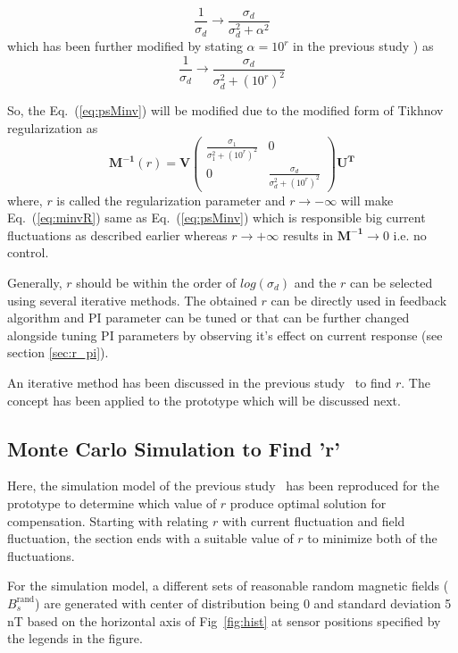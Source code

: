 \begin{equation}
    \frac{1}{\sigma_d} \rightarrow \frac{\sigma_d}{\sigma_d^2+\alpha^2} 
\end{equation}
which has been further modified by stating $\alpha=10^r$ in the previous study \cite{bea}) as
\begin{equation}\label{eq:sigma}
    \frac{1}{\sigma_d} \rightarrow \frac{\sigma_d}{\sigma_d^2+(10^r)^2}
\end{equation}

So, the Eq.~(\ref{eq:psMinv}) will be modified due to the modified form of Tikhnov regularization as
\begin{equation}\label{eq:minvR}
    \bm{M^{-1}}(r) = \bm{V}\begin{pmatrix} 
\frac{\sigma_1}{\sigma_1^2+(10^r)^2} & 0 \\
0 & \frac{\sigma_d}{\sigma_d^2+(10^r)^2}
\end{pmatrix} \bm{U^T}
\end{equation}
where, $r$ is called the regularization parameter and  $r \rightarrow - \infty$ will make Eq.~(\ref{eq:minvR}) same as Eq.~(\ref{eq:psMinv}) which is responsible big current fluctuations as described earlier whereas $r \rightarrow + \infty$ results in $\bm{M^{-1}} \rightarrow 0$ i.e. no control.

Generally, $r$ should be within the order of $log(\sigma_{d})$ and the $r$ can be selected using several iterative methods. The obtained $r$ can be directly used in feedback algorithm and PI parameter can be tuned or that can be further changed alongside tuning PI parameters by observing it's effect on current response (see section \ref{sec:r_pi}).


An iterative method has been discussed in  the previous study~\cite{bea} to find $r$. The concept has been applied to the prototype which will be discussed next.

\subsection{Monte Carlo Simulation to Find 'r'}\label{sec:mont}

Here, the simulation model of the previous study~\cite{bea} has been reproduced for the prototype to determine which value of $r$ produce optimal solution for compensation. Starting with relating $r$ with current fluctuation and field fluctuation, the section ends with a suitable value of $r$ to minimize both of the fluctuations.

For the simulation model, a different sets of reasonable random magnetic fields ($B_s^{\text{rand}}$) are generated with center of distribution being 0 and standard deviation 5 nT  based on the horizontal axis of Fig~\ref{fig:hist} at sensor positions specified by the legends in the figure. 

